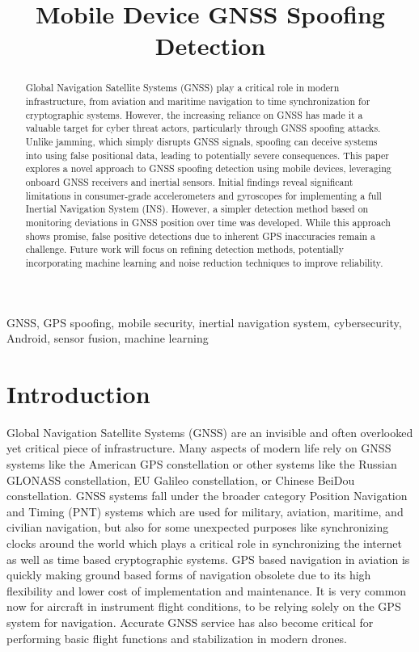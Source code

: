 \documentclass[conference]{IEEEtran}
\title{Mobile Device GNSS Spoofing Detection}
\author{
 \IEEEauthorblockN{Nathan Johnson}
 \IEEEauthorblockA{
    Embry-Riddle Aeronautical University\\
    Prescott, Arizona, USA\\
    johnsn63@my.erau.edu
  }
}
\begin{document}
\maketitle

\begin{abstract}
Global Navigation Satellite Systems (GNSS) play a critical role in modern infrastructure, from aviation and maritime navigation to time synchronization for cryptographic systems. However, the increasing reliance on GNSS has made it a valuable target for cyber threat actors, particularly through GNSS spoofing attacks. Unlike jamming, which simply disrupts GNSS signals, spoofing can deceive systems into using false positional data, leading to potentially severe consequences. This paper explores a novel approach to GNSS spoofing detection using mobile devices, leveraging onboard GNSS receivers and inertial sensors. Initial findings reveal significant limitations in consumer-grade accelerometers and gyroscopes for implementing a full Inertial Navigation System (INS). However, a simpler detection method based on monitoring deviations in GNSS position over time was developed. While this approach shows promise, false positive detections due to inherent GPS inaccuracies remain a challenge. Future work will focus on refining detection methods, potentially incorporating machine learning and noise reduction techniques to improve reliability.
\end{abstract}

\begin{IEEEkeywords}
GNSS, GPS spoofing, mobile security, inertial navigation system, cybersecurity, Android, sensor fusion, machine learning
\end{IEEEkeywords}
  

\section{Introduction}
Global Navigation Satellite Systems (GNSS) are an invisible and often overlooked yet critical piece of infrastructure. Many aspects of modern life rely on GNSS systems like the American GPS constellation or other systems like the Russian GLONASS constellation, EU Galileo constellation, or Chinese BeiDou constellation. GNSS systems fall under the broader category Position Navigation and Timing (PNT) systems which are used for military, aviation, maritime, and civilian navigation, but also for some unexpected purposes like synchronizing clocks around the world which plays a critical role in synchronizing the internet as well as time based cryptographic systems\cite{lu2021}. GPS based navigation in aviation is quickly making ground based forms of navigation obsolete due to its high flexibility and lower cost of implementation and maintenance. It is very common now for aircraft in instrument flight conditions, to be relying solely on the GPS system for navigation. Accurate GNSS service has also become critical for performing basic flight functions and stabilization in modern drones\cite{meng2021}.
\end{document}

